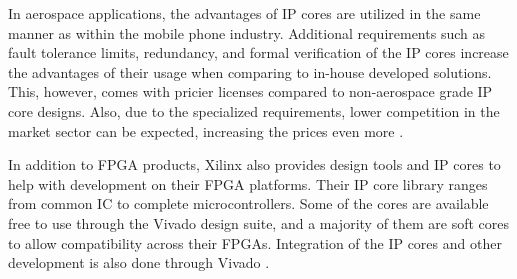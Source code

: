 \documentclass[12pt]{report}
\begin{document}
\par
In aerospace applications, the advantages of IP cores are utilized in the same manner as within the mobile phone industry. Additional requirements such as fault tolerance limits, redundancy, and formal verification of the IP cores increase the advantages of their usage when comparing to in-house developed solutions. This, however, comes with pricier licenses compared to non-aerospace grade IP core designs. Also, due to the specialized requirements, lower competition in the market sector can be expected, increasing the prices even more \citep{DO254Cadence}.
\par
In addition to FPGA products, Xilinx also provides design tools and IP cores to help with development on their FPGA platforms. Their IP core library ranges from common IC to complete microcontrollers. Some of the cores are available free to use through the Vivado design suite, and a majority of them are soft cores to allow compatibility across their FPGAs. Integration of the IP cores and other development is also done through Vivado \citep{XilVivado}.
\end{document}
